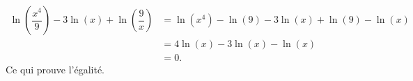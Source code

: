 \begin{align*}
\ln\left(\dfrac{x^4}{9}\right) - 3 \ln(x) + \ln\left(\dfrac{9}{x}\right) 	&= \ln(x^4) - \ln(9) - 3 \ln(x) + \ln(9) - \ln(x) \\
&= 4\ln(x) - 3 \ln(x) - \ln(x) \\
&= 0.
\end{align*}
Ce qui prouve l'égalité.
